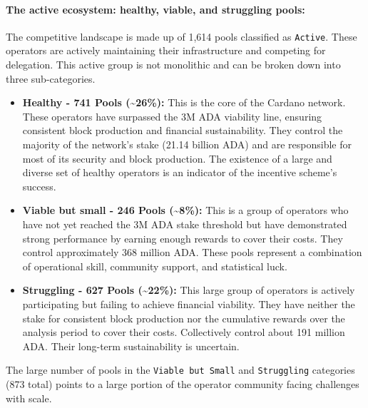 \documentclass[11pt, letterpaper]{article}
\begin{document}
\paragraph{The active ecosystem: healthy, viable, and struggling pools:} The competitive landscape is made up of 1,614 pools classified as
\texttt{Active}. These operators are actively maintaining their infrastructure
and competing for delegation. This active group is not monolithic and can be
broken down into three sub-categories.
\begin{itemize}
	\item \textbf{Healthy - 741 Pools (\textasciitilde26\%):} This is the core of the Cardano network. These operators have surpassed
	      the 3M ADA viability line, ensuring consistent block production and financial sustainability. They control
	      the majority of the network's stake (21.14 billion ADA) and are responsible for most of its security and
	      block production. The existence of a large and diverse set of healthy operators is an indicator of the
	      incentive scheme's success.
	\item \textbf{Viable but small - 246 Pools (\textasciitilde8\%):} This is a group of operators who have not yet reached the 3M
	      ADA stake threshold but have demonstrated strong performance by earning enough rewards to cover their
	      costs. They control approximately 368 million ADA\@. These pools represent a combination of operational
	      skill, community support, and statistical luck.
	\item \textbf{Struggling - 627 Pools (\textasciitilde22\%):} This large group of operators is actively participating but failing
	      to achieve financial viability. They have neither the stake for consistent block production nor the cumulative
	      rewards over the analysis period to cover their costs. Collectively control about 191 million ADA\@. Their long-term
	      sustainability is uncertain.
\end{itemize}

The large number of pools in the \texttt{Viable but Small} and
\texttt{Struggling} categories (873 total) points to a large portion of the
operator community facing challenges with scale.
\end{document}
